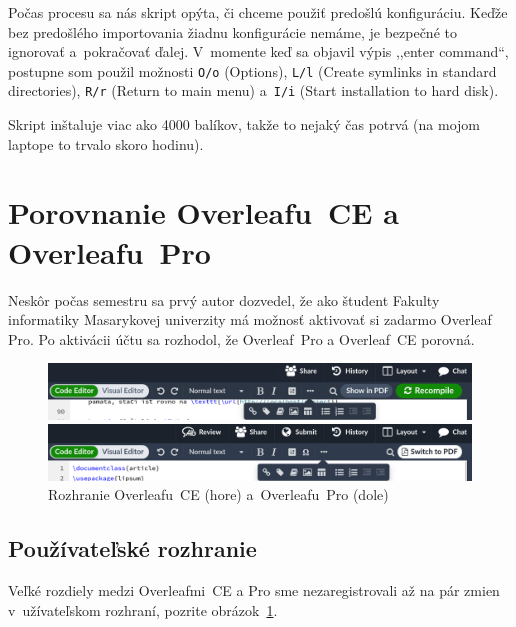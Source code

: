 \documentclass{csbulletin}
\begin{document}
Počas procesu sa nás skript opýta, či chceme použiť predošlú konfiguráciu. Keďže bez predošlého importovania žiadnu konfigurácie nemáme, je bezpečné to ignorovať a~pokračovať ďalej. V~momente keď sa objavil výpis ,,enter command``, postupne som použil možnosti \texttt{O/o} (\foreignlanguage{english}{Options}), \texttt{L/l} (\foreignlanguage{english}{Create symlinks in standard directories}), \texttt{R/r} (\foreignlanguage{english}{Return to main menu}) a~\texttt{I/i} (\foreignlanguage{english}{Start installation to hard disk}).

Skript inštaluje viac ako 4000 balíkov, takže to nejaký čas potrvá (na mojom laptope to trvalo skoro hodinu).

\fi

\vspace*{-2.5em}
\section{Porovnanie Overleafu~CE a Overleafu~Pro}
\vspace*{-0.5em}
Neskôr počas semestru sa prvý autor dozvedel, že ako študent Fakulty informatiky Masarykovej univerzity má možnosť aktivovať si zadarmo Overleaf Pro. Po aktivácii účtu sa rozhodol, že Overleaf~Pro a Overleaf~CE porovná.

\begin{figure}[t]
    \centering
    \includegraphics[width=\textwidth]{ui-ce}
    \par
    \smallskip
    \includegraphics[width=\textwidth]{ui-pro}
    \par
    \vspace*{-0.5em}
    \caption{Rozhranie Overleafu~CE (hore) a~Overleafu~Pro (dole)}
    \label{fig:ui-differences}
\end{figure}

\vspace*{-0.5em}
\subsection{Používateľské rozhranie}
Veľké rozdiely medzi Overleafmi~CE a Pro sme nezaregistrovali až na pár zmien v~užívateľskom rozhraní, pozrite obrázok~\ref{fig:ui-differences}.
\end{document}
